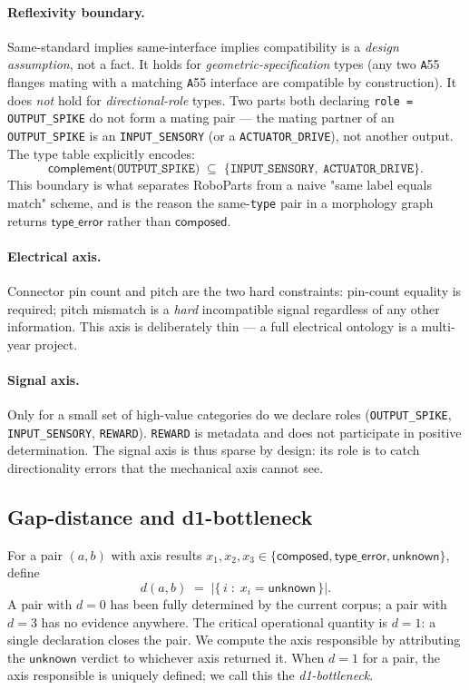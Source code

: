 \paragraph{Reflexivity boundary.}
Same-standard implies same-interface implies compatibility is a
\emph{design assumption}, not a fact. It holds for
\emph{geometric-specification} types (any two \texttt{A}55 flanges
mating with a matching \texttt{A}55 interface are compatible by
construction). It does \emph{not} hold for \emph{directional-role}
types. Two parts both declaring \texttt{role = OUTPUT\_SPIKE} do not
form a mating pair — the mating partner of an \texttt{OUTPUT\_SPIKE}
is an \texttt{INPUT\_SENSORY} (or a \texttt{ACTUATOR\_DRIVE}), not
another output. The type table explicitly encodes:
\begin{equation}
  \mathsf{complement}\!\bigl(\texttt{OUTPUT\_SPIKE}\bigr) \;\subseteq\;
    \{\texttt{INPUT\_SENSORY},\ \texttt{ACTUATOR\_DRIVE}\}.
  \label{eq:complement}
\end{equation}
This boundary is what separates RoboParts from a naive "same label
equals match" scheme, and is the reason the same-\texttt{type} pair
in a morphology graph returns $\mathsf{type\_error}$ rather than
$\mathsf{composed}$.

\paragraph{Electrical axis.}
Connector pin count and pitch are the two hard constraints: pin-count
equality is required; pitch mismatch is a \emph{hard} incompatible
signal regardless of any other information. This axis is deliberately
thin — a full electrical ontology is a multi-year project.

\paragraph{Signal axis.}
Only for a small set of high-value categories do we declare roles
(\texttt{OUTPUT\_SPIKE}, \texttt{INPUT\_SENSORY}, \texttt{REWARD}).
\texttt{REWARD} is metadata and does not participate in positive
determination. The signal axis is thus sparse by design: its role is
to catch directionality errors that the mechanical axis cannot see.

\subsection{Gap-distance and d1-bottleneck}

For a pair $(a, b)$ with axis results $x_1, x_2, x_3 \in
\{\mathsf{composed}, \mathsf{type\_error}, \mathsf{unknown}\}$,
define
\begin{equation}
  d(a, b) \;=\; |\{\, i \;:\; x_i = \mathsf{unknown}\,\}|.
  \label{eq:gapd}
\end{equation}
A pair with $d=0$ has been fully determined by the current corpus;
a pair with $d=3$ has no evidence anywhere. The critical
operational quantity is $d=1$: a single declaration closes the pair.
We compute the axis responsible by attributing the $\mathsf{unknown}$
verdict to whichever axis returned it. When $d=1$ for a pair, the
axis responsible is uniquely defined; we call this the
\emph{d1-bottleneck}.

